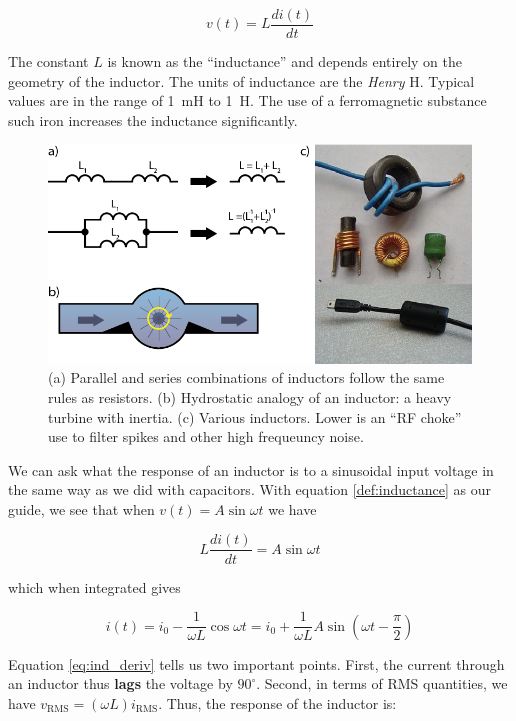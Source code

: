 \documentclass{tufte-book}
\begin{document}
\begin{equation}\label{def:inductance}
v(t) = L\frac{di(t)}{dt}
\end{equation}

\noindent The constant $L$ is known as the ``inductance'' and depends entirely on the geometry of the inductor. The units of inductance are the \textit{Henry} H. Typical values are in the range of 1~mH to 1~H. The use of a ferromagnetic substance such iron increases the inductance significantly.

\begin{figure}[h]
\caption{(a) Parallel and series combinations of inductors follow the same rules as resistors. (b) Hydrostatic analogy of an inductor: a heavy turbine with inertia. (c) Various inductors. Lower is an ``RF choke'' use to filter spikes and other high frequeuncy noise.}
\label{fig:inductors}
\begin{center}
\includegraphics[width=\textwidth]{inductee.png}
\end{center}
\end{figure}

We can ask what the response of an inductor is to a sinusoidal input voltage in the same way as we did with capacitors. With equation \ref{def:inductance} as our guide, we see that when $v(t) = A\sin\omega t$ we have

$$
L\frac{di(t)}{dt} = A\sin\omega t
$$

\noindent which when integrated gives

\begin{equation}\label{eq:ind_deriv}
i(t) = i_0 -\frac{1}{\omega L}\cos\omega t = i_0 +\frac{1}{\omega L}A\sin\left(\omega t  -\frac{\pi}{2}\right)
\end{equation}

\noindent Equation \ref{eq:ind_deriv} tells us two important points. First, the current through an inductor thus \textbf{lags} the voltage by $90^\circ$. Second, in terms of RMS quantities, we have $v_\text{RMS} = \left(\omega L\right)i_\text{RMS}$. Thus, the response of the inductor is:
\end{document}
